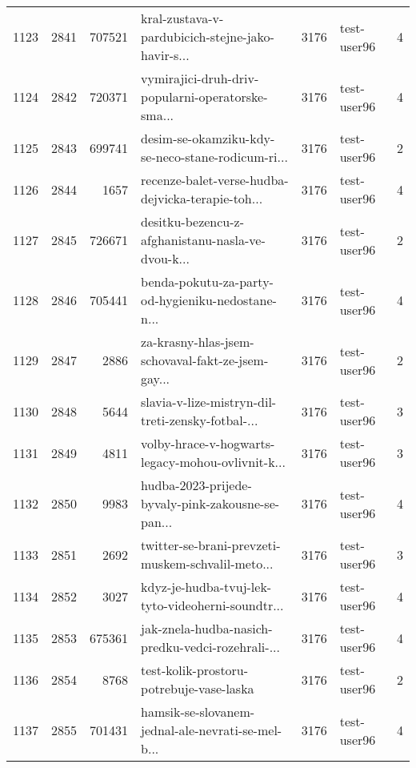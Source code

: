 \begin{tabular}{lrrlrlr}
1123 &       2841 &   707521 &  kral-zustava-v-pardubicich-stejne-jako-havir-s... &     3176 &                  test-user96 &               4 \\
1124 &       2842 &   720371 &  vymirajici-druh-driv-popularni-operatorske-sma... &     3176 &                  test-user96 &               4 \\
1125 &       2843 &   699741 &  desim-se-okamziku-kdy-se-neco-stane-rodicum-ri... &     3176 &                  test-user96 &               2 \\
1126 &       2844 &     1657 &  recenze-balet-verse-hudba-dejvicka-terapie-toh... &     3176 &                  test-user96 &               4 \\
1127 &       2845 &   726671 &  desitku-bezencu-z-afghanistanu-nasla-ve-dvou-k... &     3176 &                  test-user96 &               2 \\
1128 &       2846 &   705441 &  benda-pokutu-za-party-od-hygieniku-nedostane-n... &     3176 &                  test-user96 &               4 \\
1129 &       2847 &     2886 &  za-krasny-hlas-jsem-schovaval-fakt-ze-jsem-gay... &     3176 &                  test-user96 &               2 \\
1130 &       2848 &     5644 &  slavia-v-lize-mistryn-dil-treti-zensky-fotbal-... &     3176 &                  test-user96 &               3 \\
1131 &       2849 &     4811 &  volby-hrace-v-hogwarts-legacy-mohou-ovlivnit-k... &     3176 &                  test-user96 &               3 \\
1132 &       2850 &     9983 &  hudba-2023-prijede-byvaly-pink-zakousne-se-pan... &     3176 &                  test-user96 &               4 \\
1133 &       2851 &     2692 &  twitter-se-brani-prevzeti-muskem-schvalil-meto... &     3176 &                  test-user96 &               3 \\
1134 &       2852 &     3027 &  kdyz-je-hudba-tvuj-lek-tyto-videoherni-soundtr... &     3176 &                  test-user96 &               4 \\
1135 &       2853 &   675361 &  jak-znela-hudba-nasich-predku-vedci-rozehrali-... &     3176 &                  test-user96 &               4 \\
1136 &       2854 &     8768 &           test-kolik-prostoru-potrebuje-vase-laska &     3176 &                  test-user96 &               2 \\
1137 &       2855 &   701431 &  hamsik-se-slovanem-jednal-ale-nevrati-se-mel-b... &     3176 &                  test-user96 &               4 \\

\end{tabular}
